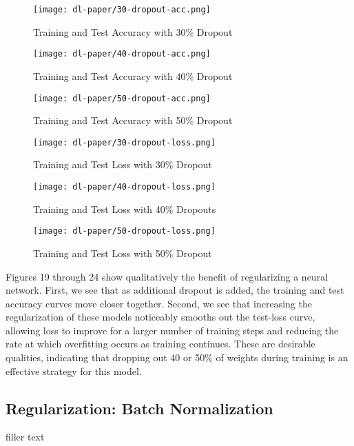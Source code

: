 \documentclass[12pt]{article}  %
\theoremstyle{definition}
\theoremstyle{remark}
\begin{document}
\begin{figure}[!h]
  \texttt{[image: dl-paper/30-dropout-acc.png]}
  \caption{Training and Test Accuracy with 30\% Dropout}\label{30-drop}
\endminipage\hfill
{}
  \texttt{[image: dl-paper/40-dropout-acc.png]}
  \caption{Training and Test Accuracy with 40\% Dropout}\label{40-drop}
\endminipage\hfill
{}%
  \texttt{[image: dl-paper/50-dropout-acc.png]}
  \caption{Training and Test Accuracy with 50\% Dropout}\label{50-drop}
\endminipage
\end{figure}


\begin{figure}[!h]
  \texttt{[image: dl-paper/30-dropout-loss.png]}
  \caption{Training and Test Loss with 30\% Dropout}\label{30-drop-loss}
\endminipage\hfill
{}
  \texttt{[image: dl-paper/40-dropout-loss.png]}
  \caption{Training and Test Loss with 40\% Dropouts}\label{40-drop-loss}
\endminipage\hfill
{}%
  \texttt{[image: dl-paper/50-dropout-loss.png]}
  \caption{Training and Test Loss with 50\% Dropout}\label{50-drop-loss}
\endminipage
\end{figure}

\par Figures 19 through 24 show qualitatively the benefit of regularizing a neural network. First, we see that as additional dropout is added, the training and test accuracy curves move closer together. Second, we see that increasing the regularization of these models noticeably smooths out the test-loss curve, allowing loss to improve for a larger number of training steps and reducing the rate at which overfitting occurs as training continues. These are desirable qualities, indicating that dropping out 40 or 50\% of weights during training is an effective strategy for this model. 


\subsection{Regularization: Batch Normalization}
\par filler text
\end{document}
